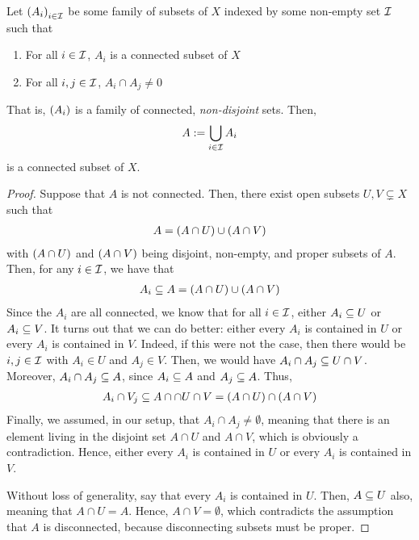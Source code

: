 \begin{boxlemma}
    Let $\left( A_i \right)_{i \in \mathcal{I}}$ be some family of subsets of $X$ indexed by some non-empty set $\mathcal{I}$ such that
    \begin{enumerate}
        \item For all $i \in \mathcal{I}$, $A_i$ is a connected subset of $X$
        \item For all $i, j \in \mathcal{I}$, $A_i \cap A_j \neq 0$
    \end{enumerate}
    That is, $\left( A_i \right)$ is a family of connected, \textit{non-disjoint} sets. Then,
    \begin{align*}
        A := \bigcup_{i \in \mathcal{I}} A_i
    \end{align*}
    is a connected subset of $X$.
\end{boxlemma}
\begin{proof}
    Suppose that $A$ is not connected. Then, there exist open subsets $U, V \subsetneq X$ such that
    \begin{align*}
        A = \left( A \cap U \right) \cup \left( A \cap V \right)
    \end{align*}
    with $\left( A \cap U \right)$ and $\left( A \cap V \right)$ being disjoint, non-empty, and proper subsets of $A$. Then, for any $i \in \mathcal{I}$, we have that
    \begin{align*}
        A_i \subseteq A = \left( A \cap U \right) \cup \left( A \cap V \right)
    \end{align*}
    Since the $A_i$ are all connected, we know that for all $i \in \mathcal{I}$, either $A_i \subseteq U$ or $A_i \subseteq V$. It turns out that we can do better: either every $A_i$ is contained in $U$ or every $A_i$ is contained in $V$. Indeed, if this were not the case, then there would be $i, j \in \mathcal{I}$ with $A_i \in U$ and $A_j \in V$. Then, we would have $A_i \cap A_j \subseteq U \cap V$. Moreover, $A_i \cap A_j \subseteq A$, since $A_i \subseteq A$ and $A_j \subseteq A$. Thus,
    \begin{align*}
        A_i \cap V_j \subseteq A \cap \cap{U \cap V} = \left( A \cap U \right) \cap \left( A \cap V \right)
    \end{align*}
    Finally, we assumed, in our setup, that $A_i \cap A_j \neq \emptyset$, meaning that there is an element living in the disjoint set $A \cap U$ and $A \cap V$, which is obviously a contradiction. Hence, either every $A_i$ is contained in $U$ or every $A_i$ is contained in $V$.

    Without loss of generality, say that every $A_i$ is contained in $U$. Then, $A \subseteq U$ also, meaning that $A \cap U = A$. Hence, $A \cap V = \emptyset$, which contradicts the assumption that $A$ is disconnected, because disconnecting subsets must be proper.
\end{proof}

